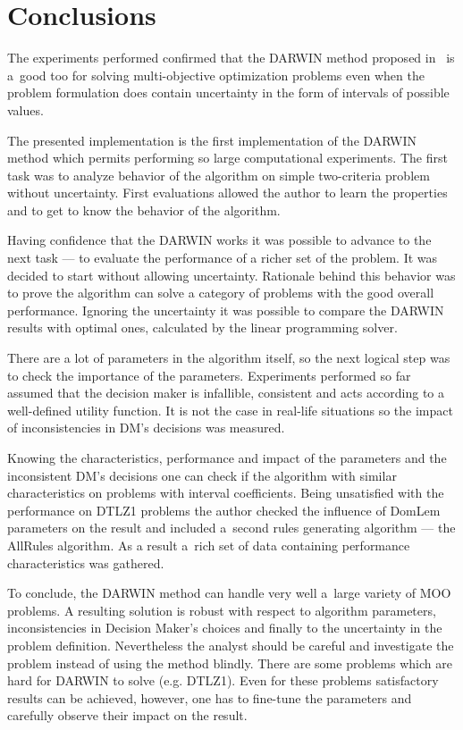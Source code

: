 

\section{Conclusions}

The experiments performed confirmed that the DARWIN method proposed
in~\cite{GMS10, GMS10b, GMS10c} is a~good too for solving multi-objective
optimization problems even when the problem formulation does contain
uncertainty in the form of intervals of possible values.

The presented implementation is the first implementation of the DARWIN method
which permits performing so large computational experiments. The first task
was to analyze behavior of the algorithm on simple two-criteria problem
without uncertainty. First evaluations allowed the author to learn the
properties and to get to know the behavior of the algorithm.

Having confidence that the DARWIN works it was possible to advance to the next
task --- to evaluate the performance of a richer set of the problem. It was
decided to start without allowing uncertainty. Rationale behind this behavior
was to prove the algorithm can solve a category of problems with the good
overall performance. Ignoring the uncertainty it was possible to compare the
DARWIN results with optimal ones, calculated by the linear programming solver.

There are a lot of parameters in the algorithm itself, so the next logical
step was to check the importance of the parameters. Experiments performed so
far assumed that the decision maker is infallible, consistent and acts
according to a well-defined utility function. It is not the case in real-life
situations so the impact of inconsistencies in DM's decisions was measured.

Knowing the characteristics, performance and impact of the parameters and the
inconsistent DM's decisions one can check if the algorithm with similar
characteristics on problems with interval coefficients. Being unsatisfied with
the performance on DTLZ1 problems the author checked the influence of DomLem
parameters on the result and included a~second rules generating algorithm ---
the AllRules algorithm. As a result a~rich set of data containing performance
characteristics was gathered.

To conclude, the DARWIN method can handle very well a~large variety of MOO
problems. A resulting solution is robust with respect to algorithm parameters,
inconsistencies in Decision Maker's choices and finally to the uncertainty in
the problem definition. Nevertheless the analyst should be careful and
investigate the problem instead of using the method blindly. There are some
problems which are hard for DARWIN to solve (e.g. DTLZ1). Even for these
problems satisfactory results can be achieved, however, one has to fine-tune
the parameters and carefully observe their impact on the result.

